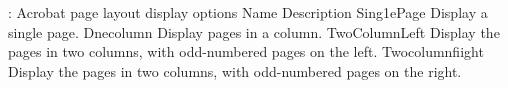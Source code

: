  
: Acrobat page layout display options 
Name Description 
Sing1ePage Display a single page. 
Dnecolumn Display pages in a column. 
TwoColumnLeft Display the pages in two columns, with odd-numbered pages on the left. 
Twocolumnfiight 
Display the pages in two columns, with odd-numbered pages on the right. 
